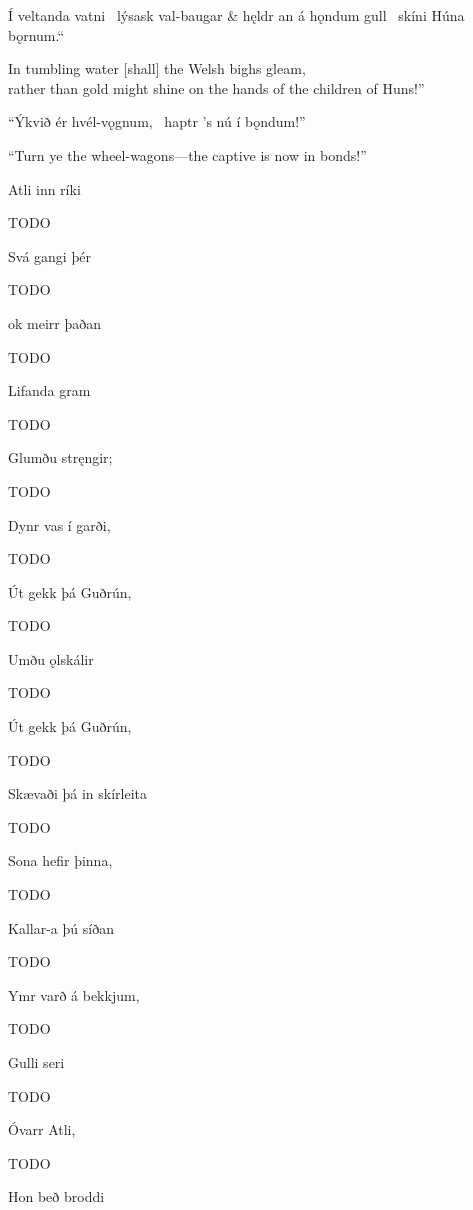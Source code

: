 \bvg\bva Í veltanda vatni \hld\ lýsask val-baugar &
hęldr an á hǫndum gull \hld\ skíni Húna bǫrnum.“\eva

\bvb In tumbling water [shall] the Welsh bighs gleam, \\
rather than gold might shine on the hands of the children of Huns!”\evb\evg


\bvg\bva “Ýkvið ér hvél-vǫgnum, \hld\ haptr ’s nú í bǫndum!”\eva

\bvb “Turn ye the wheel-wagons—the captive is now in bonds!”\evb\evg


\bvg\bva Atli inn ríki\eva

\bvb TODO\evb\evg


\bvg\bva Svá gangi þér\eva

\bvb TODO\evb\evg


\bvg\bva ok meirr þaðan\eva

\bvb TODO\evb\evg


\bvg\bva Lifanda gram\eva

\bvb TODO\evb\evg


\bvg\bva Glumðu stręngir;\eva

\bvb TODO\evb\evg


\bvg\bva Dynr vas í garði,\eva

\bvb TODO\evb\evg


\bvg\bva Út gekk þá Guðrún,\eva

\bvb TODO\evb\evg


\bvg\bva Umðu ǫlskálir\eva

\bvb TODO\evb\evg


\bvg\bva Út gekk þá Guðrún,\eva

\bvb TODO\evb\evg


\bvg\bva Skævaði þá in skírleita\eva

\bvb TODO\evb\evg


\bvg\bva Sona hefir þinna, \eva

\bvb TODO\evb\evg


\bvg\bva Kallar-a þú síðan \eva

\bvb TODO\evb\evg


\bvg\bva Ymr varð á bekkjum, \eva

\bvb TODO\evb\evg


\bvg\bva Gulli seri \eva

\bvb TODO\evb\evg


\bvg\bva Óvarr Atli, \eva

\bvb TODO\evb\evg


\bvg\bva Hon beð broddi \eva

